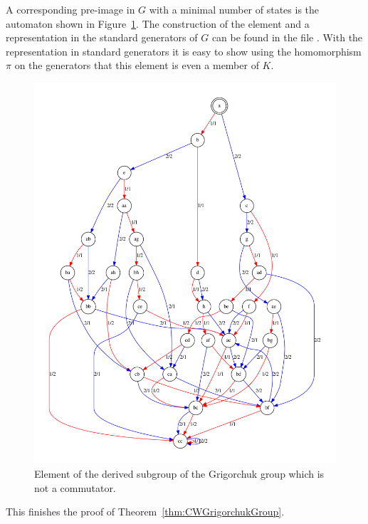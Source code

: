 \documentclass[a4paper,11pt]{amsart}
\begin{document}
 A corresponding pre-image in $G$ with a minimal number of states is the automaton shown in Figure~\ref{fig:noncomm}. 
The construction of the element and a representation in the standard generators of $G$ can be found in the file
 . With the representation in standard generators it is easy to show using the 
 homomorphism $\pi$ on the generators that this element is even a member of $K$.
\begin{figure}
 \includegraphics[width=\textwidth]{gap/PCD/noncomm29states}
 \caption{Element of the derived subgroup of the Grigorchuk group which is not a commutator.}\label{fig:noncomm}
\end{figure}
This finishes the proof of Theorem~\ref{thm:CWGrigorchukGroup}.
\end{document}
